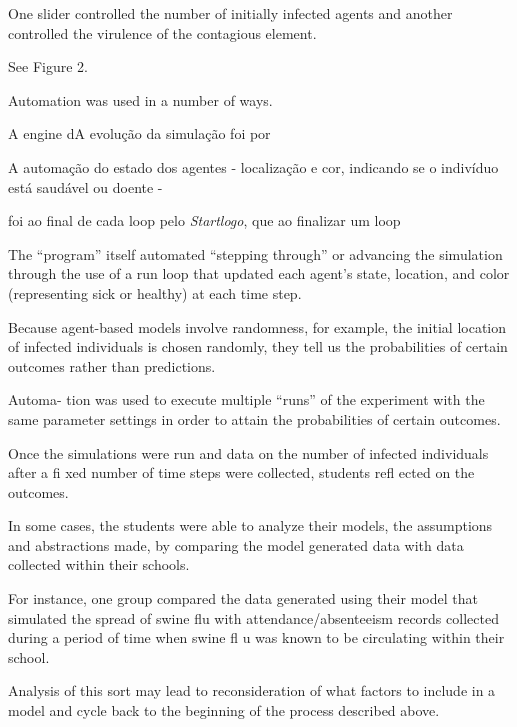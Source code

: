 One slider controlled the number of initially infected agents and another controlled the virulence of the contagious element.

See Figure 2.

Automation was used in a number of ways.

 

A engine dA evolução da simulação foi  por 

A automação do estado dos agentes - localização e cor, indicando se o indivíduo está saudável ou doente - 




foi ao final de cada loop pelo \textit{Startlogo}, que ao finalizar um loop 



The “program” itself automated “stepping through” or advancing the simulation through the use of a run loop that updated each agent’s state, location, and color (representing sick or healthy) at each time step.

Because agent-based models involve randomness, for example, the initial location of infected individuals is chosen randomly, they tell us the probabilities of certain outcomes rather than predictions.

Automa- tion was used to execute multiple “runs” of the experiment with the same parameter settings in order to attain the probabilities of certain outcomes.

Once the simulations were run and data on the number of infected individuals after a fi xed number of time steps were collected, students refl ected on the outcomes.

In some cases, the students were able to analyze their models, the assumptions and abstractions made, by comparing the model generated data with data collected within their schools.

For instance, one group compared the data generated using their model that simulated the spread of swine flu with attendance/absenteeism records collected during a period of time when swine fl u was known to be circulating within their school.

Analysis of this sort may lead to reconsideration of what factors to include in a model and cycle back to the beginning of the process described above.

